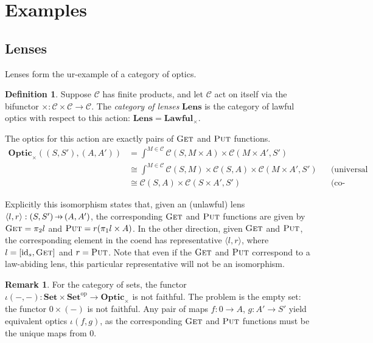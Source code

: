 \documentclass[11pt,a4paper]{article}
\theoremstyle{plain}
\theoremstyle{definition}
\newtheorem{definition}[theorem]{Definition}
\newtheorem{remark}[theorem]{Remark}
\newcommand{\C}{\mathscr{C}}
\newcommand{\Set}{\mathbf{Set}}
\newcommand{\Optic}{\mathbf{Optic}}
\newcommand{\Lawful}{\mathbf{Lawful}}
\newcommand{\Lens}{\mathbf{Lens}}
\newcommand{\id}{\mathrm{id}}
\newcommand{\op}{\mathrm{op}}
\newcommand{\fget}{\textsc{Get}}
\newcommand{\fput}{\textsc{Put}}
\newcommand{\hto}{\ensuremath{\,\mathaccent\shortmid\rightarrow\,}}
\begin{document}
\section{Examples}
\label{lawful-examples}

\subsection{Lenses}

Lenses form the ur-example of a category of optics.

\begin{definition}
Suppose $\C$ has finite products, and let $\C$ act on itself via the bifunctor $\times : \C \times \C \to \C$. The \emph{category of lenses} $\Lens$ is the category of lawful optics with respect to this action: $\Lens = \Lawful_\times$.
\end{definition}

The optics for this action are exactly pairs of $\fget$ and $\fput$ functions.
\begin{align*}
\Optic_\times((S, S'), (A, A')) &= \int^{M \in \C} \C(S, M \times A) \times \C(M \times A', S') \\
&\cong \int^{M \in \C} \C(S, M) \times \C(S, A) \times \C(M \times A', S') && \text{(universal property of product)} \\
&\cong \C(S, A) \times \C(S \times A', S') && \text{(co-Yoneda)}
\end{align*}

Explicitly this isomorphism states that, given an (unlawful) lens $\langle l, r \rangle : (S, S') \hto (A, A')$, the corresponding $\fget$ and $\fput$ functions are given by $\fget = \pi_2 l$ and $\fput = r (\pi_1 l \times A)$. In the other direction, given $\fget$ and $\fput$, the corresponding element in the coend has representative $\langle l, r \rangle$, where $l = [\id_s, \fget]$ and $r = \fput$. Note that even if the $\fget$ and $\fput$ correspond to a law-abiding lens, this particular representative will not be an isomorphism.

\begin{remark} \label{lens-iota-not-faithful}
For the category of sets, the functor $\iota(-, -) : \Set \times \Set^\op \to \Optic_\times$ is not faithful. The problem is the empty set: the functor $0 \times (-)$ is not faithful. Any pair of maps $f : 0 \to A$, $g : A' \to S'$ yield equivalent optics $\iota(f, g)$, as the corresponding $\fget$ and $\fput$ functions must be the unique maps from $0$.
\end{remark}
\end{document}
